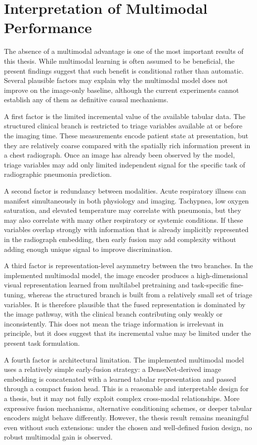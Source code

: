 \section{Interpretation of Multimodal Performance}

The absence of a multimodal advantage is one of the most important results of this thesis. While multimodal learning is often assumed to be beneficial, the present findings suggest that such benefit is conditional rather than automatic. Several plausible factors may explain why the multimodal model does not improve on the image-only baseline, although the current experiments cannot establish any of them as definitive causal mechanisms.

A first factor is the limited incremental value of the available tabular data. The structured clinical branch is restricted to triage variables available at or before the imaging time. These measurements encode patient state at presentation, but they are relatively coarse compared with the spatially rich information present in a chest radiograph. Once an image has already been observed by the model, triage variables may add only limited independent signal for the specific task of radiographic pneumonia prediction.

A second factor is redundancy between modalities. Acute respiratory illness can manifest simultaneously in both physiology and imaging. Tachypnea, low oxygen saturation, and elevated temperature may correlate with pneumonia, but they may also correlate with many other respiratory or systemic conditions. If these variables overlap strongly with information that is already implicitly represented in the radiograph embedding, then early fusion may add complexity without adding enough unique signal to improve discrimination.

A third factor is representation-level asymmetry between the two branches. In the implemented multimodal model, the image encoder produces a high-dimensional visual representation learned from multilabel pretraining and task-specific fine-tuning, whereas the structured branch is built from a relatively small set of triage variables. It is therefore plausible that the fused representation is dominated by the image pathway, with the clinical branch contributing only weakly or inconsistently. This does not mean the triage information is irrelevant in principle, but it does suggest that its incremental value may be limited under the present task formulation.

A fourth factor is architectural limitation. The implemented multimodal model uses a relatively simple early-fusion strategy: a DenseNet-derived image embedding is concatenated with a learned tabular representation and passed through a compact fusion head. This is a reasonable and interpretable design for a thesis, but it may not fully exploit complex cross-modal relationships. More expressive fusion mechanisms, alternative conditioning schemes, or deeper tabular encoders might behave differently. However, the thesis result remains meaningful even without such extensions: under the chosen and well-defined fusion design, no robust multimodal gain is observed.

